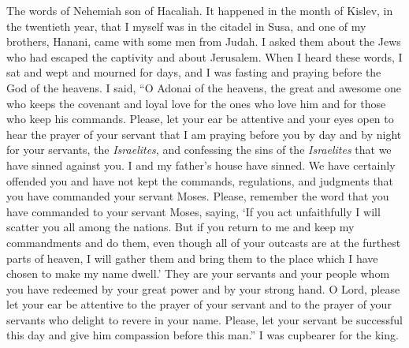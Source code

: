 
\begin{biblechapter} %
 The words of Nehemiah son of Hacaliah.
\verse It happened in the month of Kislev, in the twentieth year, that I myself was in the citadel in Susa,
\verse and one of my brothers, Hanani, came with some men from Judah. I asked them about the Jews who had escaped the captivity and about Jerusalem.
\verse When I heard these words, I sat and wept and mourned for days, and I was fasting and praying before the God of the heavens.
\verse I said, “O Adonai of the heavens, the great and awesome one who keeps the covenant and loyal love for the ones who love him and for those who keep his commands.
\verse Please, let your ear be attentive and your eyes open to hear the prayer of your servant that I am praying before you by day and by night for your servants, the \textit{Israelites}, and confessing the sins of the \textit{Israelites} that we have sinned against you. I and my father’s house have sinned.
\verse We have certainly offended you and have not kept the commands, regulations, and judgments that you have commanded your servant Moses.
\verse Please, remember the word that you have commanded to your servant Moses, saying, ‘If you act unfaithfully I will scatter you all among the nations.
\verse But if you return to me and keep my commandments and do them, even though all of your outcasts are at the furthest parts of heaven, I will gather them and bring them to the place which I have chosen to make my name dwell.’
\verse They are your servants and your people whom you have redeemed by your great power and by your strong hand.
\verse O Lord, please let your ear be attentive to the prayer of your servant and to the prayer of your servants who delight to revere in your name. Please, let your servant be successful this day and give him compassion before this man.” I was cupbearer for the king.
\end{biblechapter}

